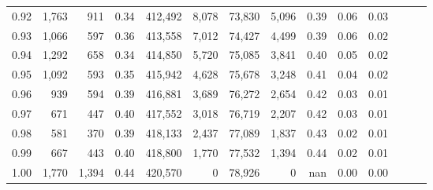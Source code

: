 \begin{tabular}{rrrrrrrrrrrrrr}
0.92 &  1,763 &    911 &  0.34 &  412,492 &    8,078 &  73,830 &   5,096 &  0.39 &  0.06 &      0.03 \\
0.93 &  1,066 &    597 &  0.36 &  413,558 &    7,012 &  74,427 &   4,499 &  0.39 &  0.06 &      0.02 \\
0.94 &  1,292 &    658 &  0.34 &  414,850 &    5,720 &  75,085 &   3,841 &  0.40 &  0.05 &      0.02 \\
0.95 &  1,092 &    593 &  0.35 &  415,942 &    4,628 &  75,678 &   3,248 &  0.41 &  0.04 &      0.02 \\
0.96 &    939 &    594 &  0.39 &  416,881 &    3,689 &  76,272 &   2,654 &  0.42 &  0.03 &      0.01 \\
0.97 &    671 &    447 &  0.40 &  417,552 &    3,018 &  76,719 &   2,207 &  0.42 &  0.03 &      0.01 \\
0.98 &    581 &    370 &  0.39 &  418,133 &    2,437 &  77,089 &   1,837 &  0.43 &  0.02 &      0.01 \\
0.99 &    667 &    443 &  0.40 &  418,800 &    1,770 &  77,532 &   1,394 &  0.44 &  0.02 &      0.01 \\
1.00 &  1,770 &  1,394 &  0.44 &  420,570 &        0 &  78,926 &       0 &   nan &  0.00 &      0.00 \\
\bottomrule
\end{tabular}
